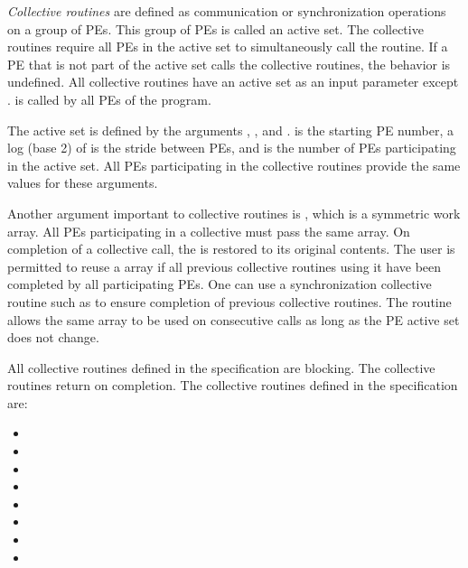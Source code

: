 \emph{Collective routines} are defined as communication or synchronization
operations on a group of \acp{PE}. This group of  \acp{PE} is called an active set.
The collective routines require all \acp{PE} in the active set to simultaneously call the
routine. If a \ac{PE} that is not part of the active set calls the collective
routines, the behavior is undefined.  All collective routines have an
active set as an input parameter except \barrierall. \barrierall is
called by all \acp{PE} of the \openshmem program. 

The active set is defined by the arguments , ,
and .   is the starting \ac{PE} number, a log (base
2) of  is the stride between \acp{PE}, and  is
the number of \acp{PE} participating in the active set.  All \acp{PE}
participating in the collective routines provide the same values for these
arguments. 
 
Another argument important to collective routines is , which is a
symmetric work array.  All \acp{PE} participating in a collective must pass the
same  array.  On completion of a collective call, the  is
restored to its original contents.  The user is permitted to reuse a 
array if all previous collective routines using it have been
completed by all participating \acp{PE}.  One can use a synchronization
collective routine such as \barrier to ensure completion of previous collective
routines. The  routine allows the same  array to
be used on consecutive calls as long as the \ac{PE} active set does not change. 

All collective routines defined in the specification are blocking.  The
collective routines return on completion.  The collective routines defined in
the \openshmem specification are:

\begin{itemize}
\item[] \broadcast 
\item[] \barrier
\item[] \barrierall
\item[] \collect
\item[] \fcollect
\item[] \reduction
\item[] \alltoall
\item[] \alltoalls
\end{itemize} 
